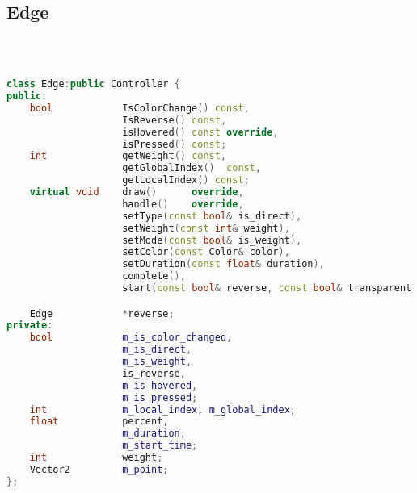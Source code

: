 \subsection{Edge}
\begin{lstlisting}[language=C++]



class Edge:public Controller {
public:
    bool            IsColorChange() const,
                    IsReverse() const,
                    isHovered() const override,
                    isPressed() const;
    int             getWeight() const,
                    getGlobalIndex()  const,
                    getLocalIndex() const;
    virtual void    draw()      override,
                    handle()    override,
                    setType(const bool& is_direct),
                    setWeight(const int& weight),
                    setMode(const bool& is_weight),
                    setColor(const Color& color),
                    setDuration(const float& duration),
                    complete(),
                    start(const bool& reverse, const bool& transparent = true);

    Edge            *reverse;
private:
    bool            m_is_color_changed,
                    m_is_direct,
                    m_is_weight,
                    is_reverse,
                    m_is_hovered,
                    m_is_pressed;
    int             m_local_index, m_global_index;
    float           percent,
                    m_duration,
                    m_start_time;
    int             weight;
    Vector2         m_point;
};






\end{lstlisting}
